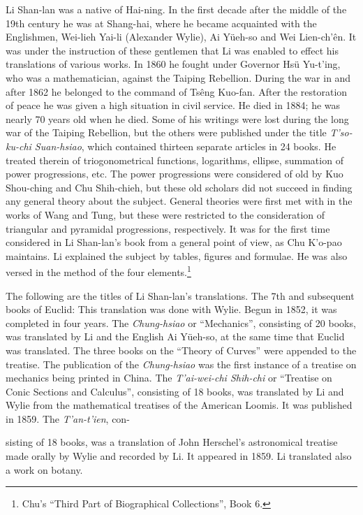 \documentclass[11pt]{article}
\newcommand{\scanpage}[2]{\clearpage\setcounter{footnote}{0}\noindent{\footnotesize\color{gray}PDF page #1 · #2}\par\medskip}
\newcommand{\scanfooter}{}
\begin{document}
Li Shan-lan was a native of Hai-ning. In the first decade after the middle of the 19th century he was at Shang-hai, where he became acquainted with the Englishmen, Wei-lieh Yai-li (Alexander Wylie), Ai Yüeh-so and Wei Lien-ch'ên. It was under the instruction of these gentlemen that Li was enabled to effect his translations of various works. In 1860 he fought under Governor Hsü Yu-t'ing, who was a mathematician, against the Taiping Rebellion. During the war in and after 1862 he belonged to the command of Tsêng Kuo-fan. After the restoration of peace he was given a high situation in civil service. He died in 1884; he was nearly 70 years old when he died. Some of his writings were lost during the long war of the Taiping Rebellion, but the others were published under the title \emph{T'so-ku-chi Suan-hsiao}, which contained thirteen separate articles in 24 books. He treated therein of triogonometrical functions, logarithms, ellipse, summation of power progressions, etc. The power progressions were considered of old by Kuo Shou-ching and Chu Shih-chieh, but these old scholars did not succeed in finding any general theory about the subject. General theories were first met with in the works of Wang and Tung, but these were restricted to the consideration of triangular and pyramidal progressions, respectively. It was for the first time considered in Li Shan-lan's book from a general point of view, as Chu K'o-pao maintains. Li explained the subject by tables, figures and formulae. He was also versed in the method of the four elements.\footnote{Chu's ``Third Part of Biographical Collections'', Book 6.}

The following are the titles of Li Shan-lan's translations. The 7th and subsequent books of Euclid: This translation was done with Wylie. Begun in 1852, it was completed in four years. The \emph{Chung-hsiao} or ``Mechanics'', consisting of 20 books, was translated by Li and the English Ai Yüeh-so, at the same time that Euclid was translated. The three books on the ``Theory of Curves'' were appended to the treatise. The publication of the \emph{Chung-hsiao} was the first instance of a treatise on mechanics being printed in China. The \emph{T'ai-wei-chi Shih-chi} or ``Treatise on Conic Sections and Calculus'', consisting of 18 books, was translated by Li and Wylie from the mathematical treatises of the American Loomis. It was published in 1859. The \emph{T'an-t'ien}, con-
\scanfooter

\scanpage{0141}{Chapter 18, printed page 127}
sisting of 18 books, was a translation of John Herschel's astronomical treatise made orally by Wylie and recorded by Li. It appeared in 1859. Li translated also a work on botany.
\end{document}
